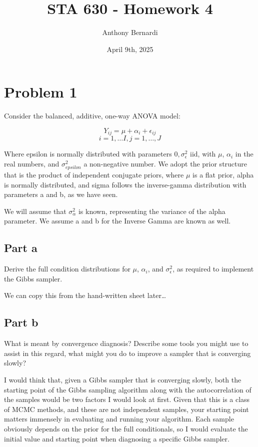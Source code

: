 \documentclass[12pt, letterpaper]{article}
\title{STA 630 - Homework 4}
\author{Anthony Bernardi}
\date{April 9th, 2025}
\begin{document}
\maketitle

\section{Problem 1}

Consider the balanced, additive, one-way ANOVA model: 

\begin{equation}
  Y_{ij} = \mu + \alpha_i + \epsilon_{ij} 
\end{equation} 
\begin{equation}
  i = 1, \dots I, j = 1, \dots, J
\end{equation} 

Where epsilon is normally distributed with parameters ${0, \sigma_{\epsilon}^2}$ iid, with $\mu$, $\alpha_i$ in the real numbers, and $\sigma_{epsilon}^2$ a non-negative number. We adopt the prior structure that is the product of independent conjugate priors, where $\mu$ is a flat prior, alpha is normally distributed, and sigma follows the inverse-gamma distribution with parameters a and b, as we have seen. 

We will assume that $\sigma_{\alpha}^2$ is known, representing the variance of the alpha parameter. We assume a and b for the Inverse Gamma are known as well. 

\subsection{Part a}

Derive the full condition distributions for $\mu$, $\alpha_i$, and $\sigma_{\epsilon}^2$, as required to implement the Gibbs sampler. 

We can copy this from the hand-written sheet later\dots 

\subsection{Part b} 

What is meant by convergence diagnosis? Describe some tools you might use to assist in this regard, what might you do to improve a sampler that is converging slowly?

I would think that, given a Gibbs sampler that is converging slowly, both the starting point of the Gibbs sampling algorithm along with the autocorrelation of the samples would be two factors I would look at first. Given that this is a class of MCMC methods, and these are not independent samples, your starting point matters immensely in evaluating and running your algorithm. Each sample obviously depends on the prior for the full conditionals, so I would evaluate the initial value and starting point when diagnosing a specific Gibbs sampler. 
\end{document}
